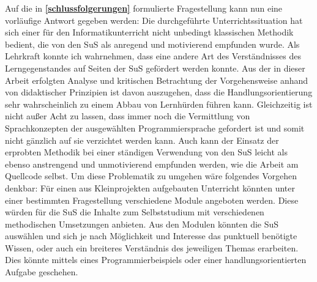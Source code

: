 \documentclass[paper=a4, DIV=13, BCOR=8mm, oneside=on, onecolumn=on, open = any, titlepage =on, parskip =half-, headsepline = on, footsepline = off, chapterprefix = on, sectionprefix = on, appendixprefix = off, fontsize = 12pt, numbers = noenddot, abstract = off]{scrreprt}
\begin{document}
Auf die in \textbf{\ref{schlussfolgerungen}} formulierte Fragestellung kann nun eine vorläufige Antwort gegeben werden: Die durchgeführte Unterrichtssituation hat sich einer für den Informatikunterricht nicht unbedingt klassischen Methodik bedient, die von den SuS als anregend und motivierend empfunden wurde. Als Lehrkraft konnte ich wahrnehmen, dass eine andere Art des Verständnisses des Lerngegenstandes auf Seiten der SuS gefördert werden konnte. Aus der in dieser Arbeit erfolgten Analyse und kritischen Betrachtung der Vorgehensweise anhand von didaktischer Prinzipien ist davon auszugehen, dass die Handlungsorientierung sehr wahrscheinlich zu einem Abbau von Lernhürden führen kann.
Gleichzeitig ist nicht außer Acht zu lassen, dass immer noch die Vermittlung von Sprachkonzepten der ausgewählten Programmiersprache gefordert ist und somit nicht gänzlich auf sie verzichtet werden kann. Auch kann der Einsatz der erprobten Methodik bei einer ständigen Verwendung von den SuS leicht als ebenso anstrengend und unmotivierend empfunden werden, wie die Arbeit am Quellcode selbst. Um diese Problematik zu umgehen wäre folgendes Vorgehen denkbar: Für einen aus Kleinprojekten aufgebauten Unterricht könnten unter einer bestimmten Fragestellung verschiedene Module angeboten werden. Diese würden für die SuS die Inhalte zum Selbststudium mit verschiedenen methodischen Umsetzungen anbieten. Aus den Modulen könnten die SuS auswählen und sich je nach Möglichkeit und Interesse das punktuell benötigte Wissen, oder auch ein breiteres Verständnis des jeweiligen Themas erarbeiten. Dies könnte mittels eines Programmierbeispiels oder einer handlungsorientierten Aufgabe geschehen.








\newpage

\newpage

\end{document}
